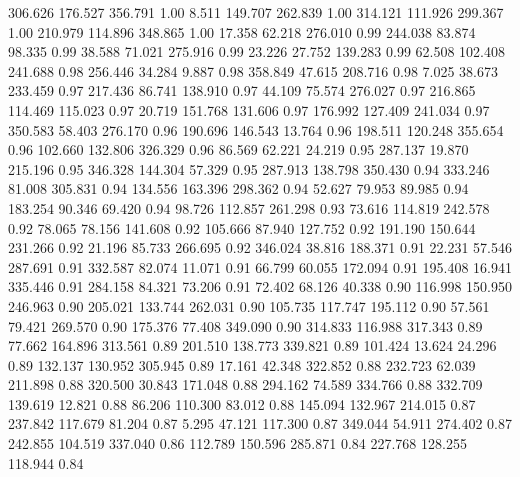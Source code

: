 306.626  176.527  356.791         1.00
   8.511  149.707  262.839         1.00
 314.121  111.926  299.367         1.00
 210.979  114.896  348.865         1.00
  17.358   62.218  276.010         0.99
 244.038   83.874   98.335         0.99
  38.588   71.021  275.916         0.99
  23.226   27.752  139.283         0.99
  62.508  102.408  241.688         0.98
 256.446   34.284    9.887         0.98
 358.849   47.615  208.716         0.98
   7.025   38.673  233.459         0.97
 217.436   86.741  138.910         0.97
  44.109   75.574  276.027         0.97
 216.865  114.469  115.023         0.97
  20.719  151.768  131.606         0.97
 176.992  127.409  241.034         0.97
 350.583   58.403  276.170         0.96
 190.696  146.543   13.764         0.96
 198.511  120.248  355.654         0.96
 102.660  132.806  326.329         0.96
  86.569   62.221   24.219         0.95
 287.137   19.870  215.196         0.95
 346.328  144.304   57.329         0.95
 287.913  138.798  350.430         0.94
 333.246   81.008  305.831         0.94
 134.556  163.396  298.362         0.94
  52.627   79.953   89.985         0.94
 183.254   90.346   69.420         0.94
  98.726  112.857  261.298         0.93
  73.616  114.819  242.578         0.92
  78.065   78.156  141.608         0.92
 105.666   87.940  127.752         0.92
 191.190  150.644  231.266         0.92
  21.196   85.733  266.695         0.92
 346.024   38.816  188.371         0.91
  22.231   57.546  287.691         0.91
 332.587   82.074   11.071         0.91
  66.799   60.055  172.094         0.91
 195.408   16.941  335.446         0.91
 284.158   84.321   73.206         0.91
  72.402   68.126   40.338         0.90
 116.998  150.950  246.963         0.90
 205.021  133.744  262.031         0.90
 105.735  117.747  195.112         0.90
  57.561   79.421  269.570         0.90
 175.376   77.408  349.090         0.90
 314.833  116.988  317.343         0.89
  77.662  164.896  313.561         0.89
 201.510  138.773  339.821         0.89
 101.424   13.624   24.296         0.89
 132.137  130.952  305.945         0.89
  17.161   42.348  322.852         0.88
 232.723   62.039  211.898         0.88
 320.500   30.843  171.048         0.88
 294.162   74.589  334.766         0.88
 332.709  139.619   12.821         0.88
  86.206  110.300   83.012         0.88
 145.094  132.967  214.015         0.87
 237.842  117.679   81.204         0.87
   5.295   47.121  117.300         0.87
 349.044   54.911  274.402         0.87
 242.855  104.519  337.040         0.86
 112.789  150.596  285.871         0.84
 227.768  128.255  118.944         0.84
